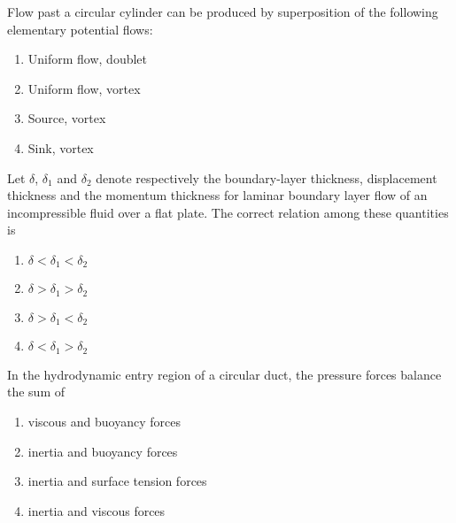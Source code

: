 \iffalse
\chapter{2013}
\author{EE24BTECH11003}
\section{xe}
\fi

\item Flow past a circular cylinder can be produced by superposition of the following elementary potential flows:
\hfill{}
\begin{enumerate}
\item Uniform flow, doublet
\item Uniform flow, vortex
\item Source, vortex
\item Sink, vortex
\end{enumerate}

\item Let $\delta$, $\delta_1$ and $\delta_2$ denote respectively the boundary-layer thickness, displacement thickness and the momentum thickness for laminar boundary layer flow of an incompressible fluid over a flat plate. The correct relation among these quantities is
\hfill{}
\begin{enumerate}
\item $\delta < \delta_1 < \delta_2$
\item $\delta > \delta_1 > \delta_2$
\item $\delta > \delta_1 < \delta_2$
\item $\delta < \delta_1 > \delta_2$
\end{enumerate}

\item In the hydrodynamic entry region of a circular duct, the pressure forces balance the sum of
\hfill{}
\begin{enumerate}
\item viscous and buoyancy forces
\item inertia and buoyancy forces
\item inertia and surface tension forces
\item inertia and viscous forces
\end{enumerate}

